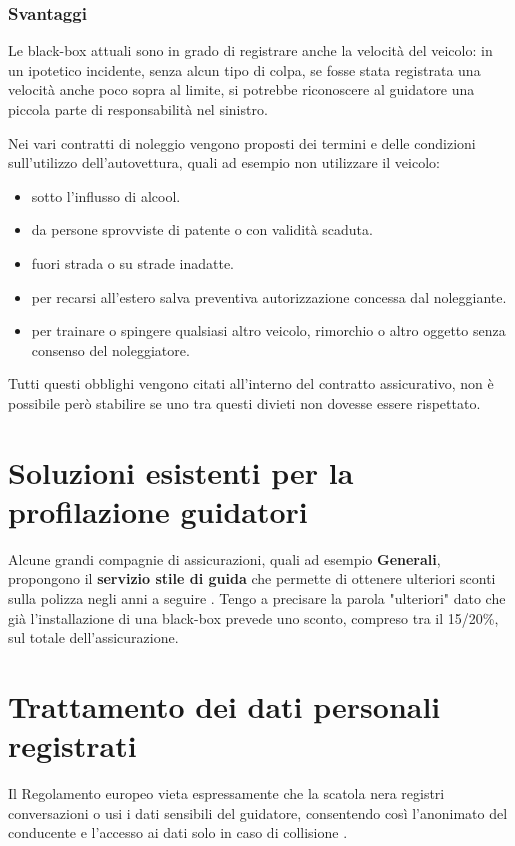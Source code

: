 \documentclass[12pt, a4paper, italian]{report}
\numberwithin{figure}{chapter}
\numberwithin{table}{chapter}
\begin{document}
\subsubsection{Svantaggi}
Le black-box attuali sono in grado di registrare anche la velocità del veicolo: in un ipotetico incidente, senza alcun tipo di colpa, se fosse stata registrata una velocità anche poco sopra al limite, si potrebbe riconoscere al guidatore una piccola parte di responsabilità nel sinistro.

\vspace{1cm}

Nei vari contratti di noleggio \cite{hertz_pdf} vengono proposti dei termini e delle condizioni sull'utilizzo dell'autovettura, quali ad esempio non utilizzare il veicolo: 
\begin{itemize}
    \item  sotto l'influsso di alcool.
    \item da persone sprovviste di patente o con validità scaduta.
    \item fuori strada o su strade inadatte.
    \item per recarsi all'estero salva preventiva autorizzazione concessa dal noleggiante.
    \item per trainare o spingere qualsiasi altro veicolo, rimorchio o altro oggetto senza consenso del noleggiatore.
\end{itemize}
Tutti questi obblighi vengono citati all'interno del contratto assicurativo, non è possibile però stabilire se uno tra questi divieti non dovesse essere rispettato.

\section{Soluzioni esistenti per la profilazione guidatori}
Alcune grandi compagnie di assicurazioni, quali ad esempio \textbf{Generali}, propongono il \textbf{servizio stile di guida} che permette di ottenere ulteriori sconti sulla polizza negli anni a seguire \cite{Generali}. Tengo a precisare la parola "ulteriori" dato che già l'installazione di una black-box prevede uno sconto, compreso tra il 15/20\%, sul totale dell'assicurazione.

\section{Trattamento dei dati personali registrati}
Il Regolamento europeo vieta espressamente che la scatola nera registri conversazioni o usi i dati sensibili del guidatore, consentendo così l’anonimato del conducente e l’accesso ai dati solo in caso di collisione \cite{RegolamentoEU}.
\end{document}
